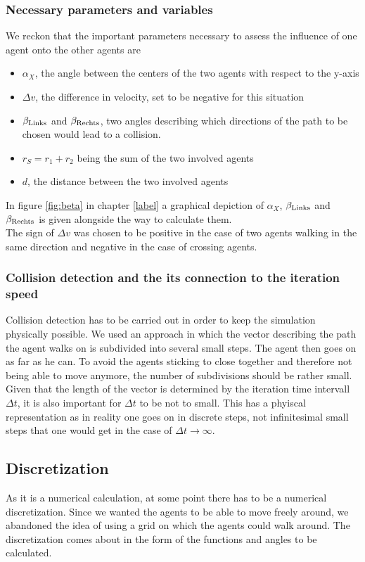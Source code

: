 \subsubsection{Necessary parameters and variables}
We reckon that the important parameters necessary to assess the influence of one agent onto the other agents are
\begin{itemize}
	\item $\alpha_X$, the angle between the centers of the two agents with respect to the y-axis
	\item $\Delta v$, the difference in velocity, set to be negative for this situation
	\item $\beta_{\text{Links}}$ and $\beta_{\text{Rechts}}$, two angles describing which directions of the path to be chosen would lead to a collision.
	\item $r_S = r_1 + r_2$ being the sum of the two involved agents
	\item $d$, the distance between the two involved agents
\end{itemize}
\noi In figure \ref{fig:beta} in chapter \ref{label} a graphical depiction of $\alpha_X$, $\beta_{\text{Links}}$ and $\beta_{\text{Rechts}}$ is given alongside the way to calculate them.\\
The sign of $\Delta v$ was chosen to be positive in the case of two agents walking in the same direction and negative in the case of crossing agents.

\subsubsection{Collision detection and the its connection to the iteration speed}
Collision detection has to be carried out in order to keep the simulation physically possible. We used an approach in which the vector describing the path the agent walks on is subdivided into several small steps. The agent then goes on as far as he can. To avoid the agents sticking to close together and therefore not being able to move anymore, the number of subdivisions should be rather small.\\
Given that the length of the vector is determined by the iteration time intervall $\Delta t$, it is also important for $\Delta t$ to be not to small. This has a phyiscal representation as in reality one goes on in discrete steps, not infinitesimal small steps that one would get in the case of $\Delta t \rightarrow \infty$.

\subsection{Discretization}
As it is a numerical calculation, at some point there has to be a numerical discretization. Since we wanted the agents to be able to move freely around, we abandoned the idea of using a grid on which the agents could walk around. The discretization comes about in the form of the functions and angles to be calculated.



